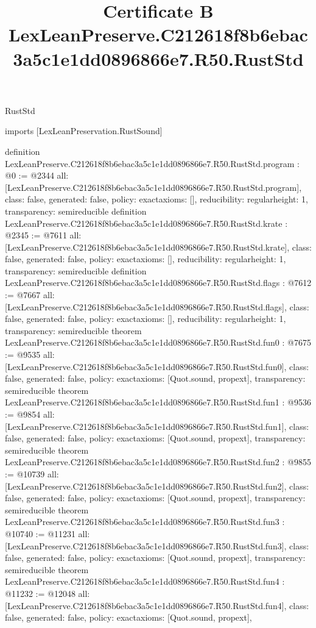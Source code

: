 \begin{lexlean}{RustStd}
\title{Certificate B LexLeanPreserve.C212618f8b6ebac3a5c1e1dd0896866e7.R50.RustStd}
\begin{coremodule}
imports [LexLeanPreservation.RustSound]

definition LexLeanPreserve.C212618f8b6ebac3a5c1e1dd0896866e7.R50.RustStd.program : @0 := @2344 {
  all: [LexLeanPreserve.C212618f8b6ebac3a5c1e1dd0896866e7.R50.RustStd.program],
  class: false,
  generated: false,
  policy: exact{axioms: []},
  reducibility: regular{height: 1},
  transparency: semireducible
}
definition LexLeanPreserve.C212618f8b6ebac3a5c1e1dd0896866e7.R50.RustStd.krate : @2345 := @7611 {
  all: [LexLeanPreserve.C212618f8b6ebac3a5c1e1dd0896866e7.R50.RustStd.krate],
  class: false,
  generated: false,
  policy: exact{axioms: []},
  reducibility: regular{height: 1},
  transparency: semireducible
}
definition LexLeanPreserve.C212618f8b6ebac3a5c1e1dd0896866e7.R50.RustStd.flags : @7612 := @7667 {
  all: [LexLeanPreserve.C212618f8b6ebac3a5c1e1dd0896866e7.R50.RustStd.flags],
  class: false,
  generated: false,
  policy: exact{axioms: []},
  reducibility: regular{height: 1},
  transparency: semireducible
}
theorem LexLeanPreserve.C212618f8b6ebac3a5c1e1dd0896866e7.R50.RustStd.fun0 : @7675 := @9535 {
  all: [LexLeanPreserve.C212618f8b6ebac3a5c1e1dd0896866e7.R50.RustStd.fun0],
  class: false,
  generated: false,
  policy: exact{axioms: [Quot.sound, propext]},
  transparency: semireducible
}
theorem LexLeanPreserve.C212618f8b6ebac3a5c1e1dd0896866e7.R50.RustStd.fun1 : @9536 := @9854 {
  all: [LexLeanPreserve.C212618f8b6ebac3a5c1e1dd0896866e7.R50.RustStd.fun1],
  class: false,
  generated: false,
  policy: exact{axioms: [Quot.sound, propext]},
  transparency: semireducible
}
theorem LexLeanPreserve.C212618f8b6ebac3a5c1e1dd0896866e7.R50.RustStd.fun2 : @9855 := @10739 {
  all: [LexLeanPreserve.C212618f8b6ebac3a5c1e1dd0896866e7.R50.RustStd.fun2],
  class: false,
  generated: false,
  policy: exact{axioms: [Quot.sound, propext]},
  transparency: semireducible
}
theorem LexLeanPreserve.C212618f8b6ebac3a5c1e1dd0896866e7.R50.RustStd.fun3 : @10740 := @11231 {
  all: [LexLeanPreserve.C212618f8b6ebac3a5c1e1dd0896866e7.R50.RustStd.fun3],
  class: false,
  generated: false,
  policy: exact{axioms: [Quot.sound, propext]},
  transparency: semireducible
}
theorem LexLeanPreserve.C212618f8b6ebac3a5c1e1dd0896866e7.R50.RustStd.fun4 : @11232 := @12048 {
  all: [LexLeanPreserve.C212618f8b6ebac3a5c1e1dd0896866e7.R50.RustStd.fun4],
  class: false,
  generated: false,
  policy: exact{axioms: [Quot.sound, propext]},
}
\end{coremodule}
\end{lexlean}
